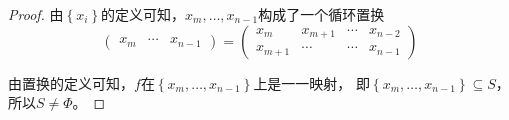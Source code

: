 \begin{questions}
\begin{solution}
\begin{proof}
            由$\left\{x_i\right\}$的定义可知，$x_m, \dots, x_{n-1}$构成了一个循环置换
            $$
                \left(
                \begin{array}{ccc}
                        x_m & \cdots & x_{n-1}
                    \end{array}
                \right)
                =
                \left(
                \begin{array}{cccc}
                        x_m     & x_{m+1} & \cdots & x_{n-2} \\
                        x_{m+1} & \cdots  & \cdots & x_{n-1}
                    \end{array}
                \right)
            $$

            由置换的定义可知，$f$在$\left\{x_m, \dots , x_{n-1} \right\}$上是一一映射，
            即$\left\{x_m, \dots , x_{n-1} \right\} \subseteq S$，所以$S \neq \Phi$。

        \end{proof}
    \end{solution}

\end{questions}

